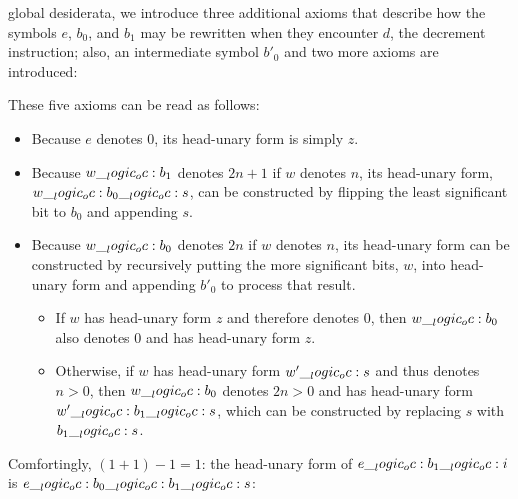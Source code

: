  global desiderata, we introduce three additional axioms that describe how the symbols $e$, $b_0$, and $b_1$ may be rewritten when they encounter $d$, the decrement instruction;
also, an intermediate symbol $b'_0$ and two more axioms are introduced:
These five axioms can be read as follows:
\begin{itemize}
\item
  Because $e$ denotes $0$, its head-unary form is simply $z$.
\item
  Because $w \__logic_oc: b_1$ denotes $2n+1$ if $w$ denotes $n$, its head-unary form, $w \__logic_oc: b_0 \__logic_oc: s$, can be constructed by flipping the least significant bit to $b_0$ and appending $s$.
\item
  Because $w \__logic_oc: b_0$ denotes $2n$ if $w$ denotes $n$, its head-unary form can be constructed by recursively putting the more significant bits, $w$, into head-unary form and appending $b'_0$ to process that result.
  \begin{itemize}
  \item
    If $w$ has head-unary form $z$ and therefore denotes $0$, then $w \__logic_oc: b_0$ also denotes $0$ and has head-unary form $z$.
  \item
    Otherwise, if $w$ has head-unary form $w' \__logic_oc: s$ and thus denotes $n > 0$, then $w \__logic_oc: b_0$ denotes $2n > 0$ and has head-unary form $w' \__logic_oc: b_1 \__logic_oc: s$, which can be constructed by replacing $s$ with $b_1 \__logic_oc: s$.
  \end{itemize}
\end{itemize}
%
Comfortingly, $(1+1)-1 = 1$: the head-unary form of $e \__logic_oc: b_1 \__logic_oc: i$ is $e \__logic_oc: b_0 \__logic_oc: b_1 \__logic_oc: s$:
